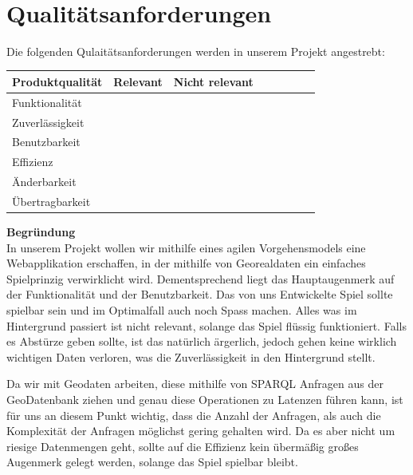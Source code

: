 \documentclass[11pt,a4paper]{article}
\newcommand{\cmark}{\ding{51}}%
\begin{document}
 \\

\tableofcontents

\flushleft

\section{Qualitätsanforderungen}

Die folgenden Qulaitätsanforderungen werden in unserem Projekt angestrebt:
\begin{center}
    \begin{tabular}{ | l | c | c | c | c | c | c | c | }
    \hline
     Produktqualität & Relevant & Nicht relevant \\ \hline
	 Funktionalität   & \cmark & \\ \hline
	 Zuverlässigkeit  &  & \cmark  \\ \hline	
	 Benutzbarkeit & \cmark &  \\ \hline
	 Effizienz & & \cmark  \\ \hline
	 Änderbarkeit &  \cmark &  \\ \hline
	 Übertragbarkeit &  \cmark & \\ \hline
	 
    \end{tabular}
\end{center}
\textbf{Begründung} \\
In unserem Projekt wollen wir mithilfe eines agilen Vorgehensmodels eine Webapplikation erschaffen, in der mithilfe von Georealdaten ein einfaches Spielprinzig verwirklicht wird. 
Dementsprechend liegt das Hauptaugenmerk auf der Funktionalität und der Benutzbarkeit.
Das von uns Entwickelte Spiel sollte spielbar sein und im Optimalfall auch noch Spass machen.
Alles was im Hintergrund passiert ist nicht relevant, solange das Spiel flüssig funktioniert.
Falls es Abstürze geben sollte, ist das natürlich ärgerlich, jedoch gehen keine wirklich wichtigen Daten verloren, was die Zuverlässigkeit in den Hintergrund stellt.

Da wir mit Geodaten arbeiten, diese mithilfe von SPARQL Anfragen aus der GeoDatenbank ziehen und genau diese Operationen zu Latenzen führen kann, ist für uns an diesem Punkt wichtig, dass die Anzahl der Anfragen, als auch die Komplexität der Anfragen möglichst gering gehalten wird.
Da es aber nicht um riesige Datenmengen geht, sollte auf die Effizienz kein übermäßig großes Augenmerk gelegt werden, solange das Spiel spielbar bleibt.
\end{document}
